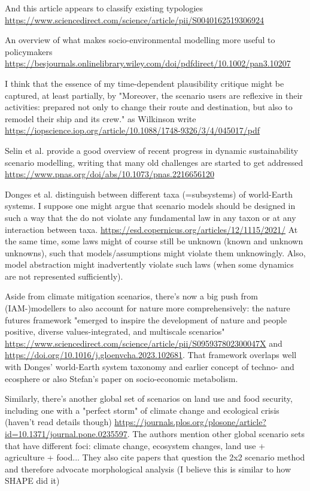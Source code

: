 \documentclass{article}
\begin{document}
And this article appears to classify existing typologies \url{https://www.sciencedirect.com/science/article/pii/S0040162519306924}

An overview of what makes socio-environmental modelling more useful to policymakers \url{https://besjournals.onlinelibrary.wiley.com/doi/pdfdirect/10.1002/pan3.10207}

I think that the essence of my time-dependent plausibility critique might be captured, at least partially, by "Moreover, the scenario users are reflexive in their activities: prepared not only to change their route and destination, but also to remodel their ship and its crew." as Wilkinson write \url{https://iopscience.iop.org/article/10.1088/1748-9326/3/4/045017/pdf}

Selin et al. provide a good overview of recent progress in dynamic sustainability scenario modelling, writing that many old challenges are started to get addressed \url{https://www.pnas.org/doi/abs/10.1073/pnas.2216656120}

Donges et al. distinguish between different taxa (=subsystems) of world-Earth systems. I suppose one might argue that scenario models should be designed in such a way that the do not violate any fundamental law in any taxon or at any interaction between taxa. \url{https://esd.copernicus.org/articles/12/1115/2021/} At the same time, some laws might of course still be unknown (known and unknown unknowns), such that models/assumptions might violate them unknowingly. Also, model abstraction might inadvertently violate such laws (when some dynamics are not represented sufficiently).

Aside from climate mitigation scenarios, there's now a big push from (IAM-)modellers to also account for nature more comprehensively: the nature futures framework "emerged to inspire the development of nature and people positive, diverse values-integrated, and multiscale scenarios" \url{https://www.sciencedirect.com/science/article/pii/S095937802300047X} and \url{https://doi.org/10.1016/j.gloenvcha.2023.102681}. That framework overlaps well with Donges' world-Earth system taxonomy and earlier concept of techno- and ecosphere or also Stefan's paper on socio-economic metabolism.

Similarly, there's another global set of scenarios on land use and food security, including one with a "perfect storm" of climate change and ecological crisis (haven't read details though) \url{https://journals.plos.org/plosone/article?id=10.1371/journal.pone.0235597}. The authors mention other global scenario sets that have different foci: climate change, ecosystem changes, land use + agriculture + food... They also cite papers that question the 2x2 scenario method and therefore advocate morphological analysis (I believe this is similar to how SHAPE did it)
\end{document}
